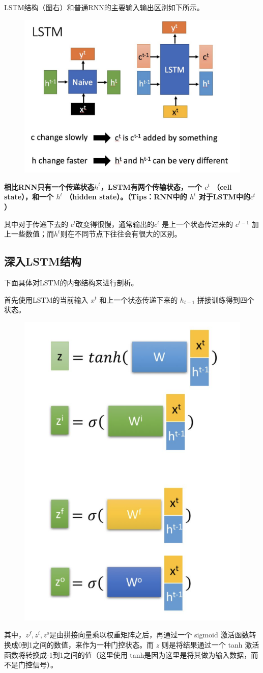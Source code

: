 \documentclass[12pt]{article}
\begin{document}
LSTM结构（图右）和普通RNN的主要输入输出区别如下所示。
\begin{figure}[H]
    \centering
    \includegraphics[width=.6\textwidth]{fig/LSTM_Compare_RNN_LSTM.png}
\end{figure}

\textbf{相比RNN只有一个传递状态$h^t$，LSTM有两个传输状态，一个 $c^t$ （cell state），和一个 $h^t$ （hidden state）。（Tips：RNN中的 $h^t$ 对于LSTM中的$c^t$ ）}

其中对于传递下去的 $c^t$改变得很慢，通常输出的$c^t$ 是上一个状态传过来的 $c^{t-1}$ 加上一些数值；而$h^t$则在不同节点下往往会有很大的区别。

\subsection{深入LSTM结构}
下面具体对LSTM的内部结构来进行剖析。

首先使用LSTM的当前输入 $x^t$ 和上一个状态传递下来的 $h_{t-1}$ 拼接训练得到四个状态。
\begin{figure}[H]
    \centering
    \includegraphics[width=.4\textwidth]{fig/LSTM_Four_States.png}
\end{figure}

其中，$z^f, z^i, z^o$是由拼接向量乘以权重矩阵之后，再通过一个 sigmoid  激活函数转换成0到1之间的数值，来作为一种门控状态。而 $z$ 则是将结果通过一个 tanh 激活函数将转换成-1到1之间的值（这里使用 tanh是因为这里是将其做为输入数据，而不是门控信号）。
\end{document}
